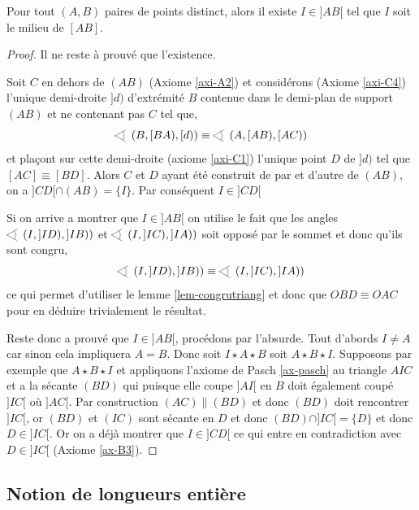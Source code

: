 \begin{thm}
    Pour tout $(A,B)$ paires de points distinct, alors il existe $I\in ]AB[$ tel que $I$ soit le milieu de $[AB]$.
\begin{proof}
    Il ne reste à prouvé que l'existence. 

    Soit $C$ en dehors de $(AB)$ (Axiome \ref{axi-A2}) et considérons (Axiome \ref{axi-C4}) l'unique demi-droite $]d)$  d'extrémité $B$ contenue dans le demi-plan de support $(AB)$ et ne contenant pas $C$ tel que,
    \begin{equation*}
        \anglesaillant \left(B,[BA),[d)\right)\equiv \anglesaillant \left(A,[AB),[AC)\right)
    \end{equation*}
    et plaçont sur cette demi-droite (axiome \ref{axi-C1}) l'unique point $D$ de $]d)$ tel que $[AC]\equiv [BD]$. Alors $C$ et $D$ ayant été construit de par et d'autre de $(AB)$, on a $]CD[\cap (AB) = \{I\}$. Par conséquent $I\in ]CD[$

    Si on arrive a montrer que $I\in ]AB[$ on utilise le fait que les angles $\anglesaillant\left(I, ]ID), ]IB)\right)$ et $\anglesaillant\left(I, ]IC), ]IA)\right)$ soit opposé par le sommet et donc qu'ils sont congru,
    \begin{equation}
        \anglesaillant\left(I, ]ID), ]IB)\right) \equiv \anglesaillant\left(I, ]IC), ]IA)\right)
    \end{equation}
    ce qui permet d'utiliser le lemme \ref{lem-congrutriang} et donc  que $OBD\equiv OAC$ pour en déduire trivialement le résultat.

    Reste donc a prouvé que $I\in ]AB[$, procédons par l'absurde. Tout d'abords $I\neq A$ car sinon cela impliquera $A=B$. Donc soit $I\star A\star B$ soit $A\star B\star I$. Supposons par exemple que $A\star B\star I$ et appliquons l'axiome de Pasch \ref{ax-pasch} au triangle $AIC$ et a la sécante $(BD)$ qui puisque elle coupe $]AI[$ en $B$ doit également coupé $]IC[$ où $]AC[$. Par construction $(AC)\| (BD)$ et donc $(BD)$ doit rencontrer $]IC[$, or $(BD)$ et $(IC)$ sont sécante en $D$ et donc $(BD)\cap ]IC[ = \{D\}$ et donc $D\in ]IC[$. Or on a déjà montrer que $I\in ]CD[$ ce qui entre en contradiction avec $D\in ]IC[$ (Axiome \ref{ax-B3}). 
\end{proof}
\end{thm}
    
        \subsection{Notion de longueurs entière}

